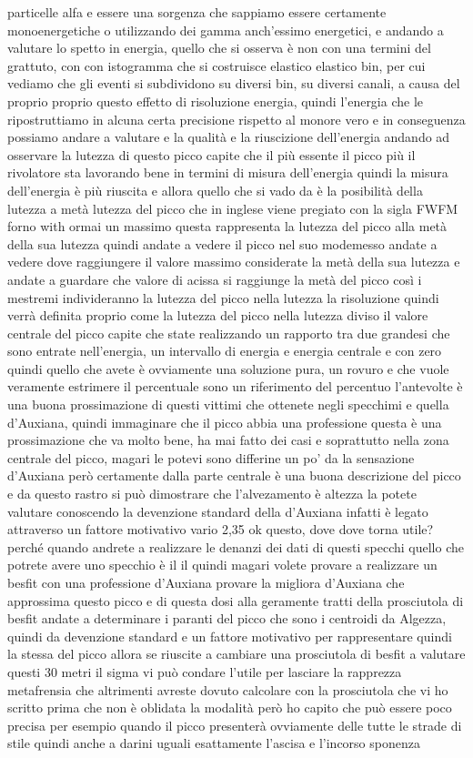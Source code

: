 particelle alfa e essere una sorgenza che sappiamo essere certamente monoenergetiche o utilizzando dei gamma anch'essimo energetici, e andando a valutare lo spetto in energia, quello che si osserva è non con una termini del grattuto, con con istogramma che si costruisce elastico elastico bin, per cui vediamo che gli eventi si subdividono su diversi bin, su diversi canali, a causa del proprio proprio questo effetto di risoluzione energia, quindi l'energia che le ripostruttiamo in alcuna certa precisione rispetto al monore vero e in conseguenza possiamo andare a valutare e la qualità e la riuscizione dell'energia andando ad osservare la lutezza di questo picco capite che il più essente il picco più il rivolatore sta lavorando bene in termini di misura dell'energia quindi la misura dell'energia è più riuscita e allora quello che si vado da è la posibilità della lutezza a metà lutezza del picco che in inglese viene pregiato con la sigla FWFM forno with ormai un massimo questa rappresenta la lutezza del picco alla metà della sua lutezza quindi andate a vedere il picco nel suo modemesso andate a vedere dove raggiungere il valore massimo considerate la metà della sua lutezza e andate a guardare che valore di acissa si raggiunge la metà del picco così i mestremi individeranno la lutezza del picco nella lutezza la risoluzione quindi verrà definita proprio come la lutezza del picco nella lutezza diviso il valore centrale del picco capite che state realizzando un rapporto tra due grandesi che sono entrate nell'energia, un intervallo di energia e energia centrale e con zero quindi quello che avete è ovviamente una soluzione pura, un rovuro e che vuole veramente estrimere il percentuale sono un riferimento del percentuo l'antevolte è una buona prossimazione di questi vittimi che ottenete negli specchimi e quella d'Auxiana, quindi immaginare che il picco abbia una professione questa è una prossimazione che va molto bene, ha mai fatto dei casi e soprattutto nella zona centrale del picco, magari le potevi sono differine un po' da la sensazione d'Auxiana però certamente dalla parte centrale è una buona descrizione del picco e da questo rastro si può dimostrare che l'alvezamento è altezza la potete valutare conoscendo la devenzione standard della d'Auxiana infatti è legato attraverso un fattore motivativo vario 2,35 ok questo, dove dove torna utile? perché quando andrete a realizzare le denanzi dei dati di questi specchi quello che potrete avere uno specchio è il il quindi magari volete provare a realizzare un besfit con una professione d'Auxiana provare la migliora d'Auxiana che approssima questo picco e di questa dosi alla geramente tratti della prosciutola di besfit andate a determinare i paranti del picco che sono i centroidi da Algezza, quindi da devenzione standard e un fattore motivativo per rappresentare quindi la stessa del picco allora se riuscite a cambiare una prosciutola di besfit a valutare questi 30 metri il sigma vi può condare l'utile per lasciare la rapprezza metafrensia che altrimenti avreste dovuto calcolare con la prosciutola che vi ho scritto prima che non è oblidata la modalità però ho capito che può essere poco precisa per esempio quando il picco presenterà ovviamente delle tutte le strade di stile quindi anche a darini uguali esattamente l'ascisa e l'incorso sponenza 
